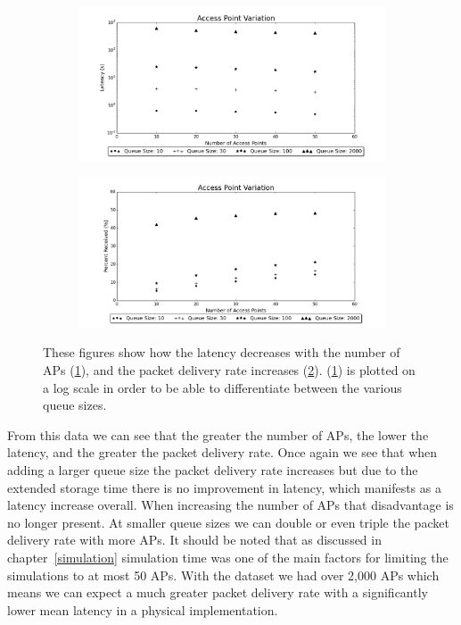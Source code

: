         \begin{figure}
            \centering
            \begin{subfigure}{\textwidth}
                \centering
                \includegraphics[width=\linewidth]{./images/Access_Point_Latency.png}
                \caption{}
                \label{fig:num_aps_latency}
            \end{subfigure}
            \begin{subfigure}{\textwidth}
                \includegraphics[width=\linewidth]{./images/Access_Point_Received.png}
                \caption{}
                \label{fig:num_aps_received}
            \end{subfigure}
            \caption{These figures show how the latency decreases with the number of APs (\ref{fig:num_aps_latency}), and the packet delivery rate increases (\ref{fig:num_aps_received}). (\ref{fig:num_aps_latency}) is plotted on a log scale in order to be able to differentiate between the various queue sizes.}
            \label{fig:num_aps}
        \end{figure}

        From this data we can see that the greater the number of APs, the lower the latency, and the greater the packet delivery rate. Once again we see that when adding a larger queue size the packet delivery rate increases but due to the extended storage time there is no improvement in latency, which manifests as a latency increase overall. When increasing the number of APs that disadvantage is no longer present. At smaller queue sizes we can double or even triple the packet delivery rate with more APs. It should be noted that as discussed in chapter~\ref{simulation} simulation time was one of the main factors for limiting the simulations to at most 50 APs. With the dataset we had over 2,000 APs which means we can expect a much greater packet delivery rate with a significantly lower mean latency in a physical implementation. 


